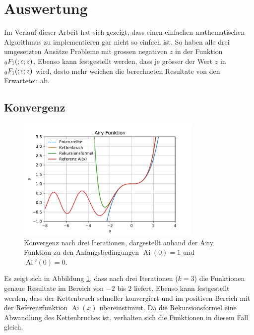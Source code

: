 %
%
%
\section{Auswertung
\label{0f1:section:teil3}}
Im Verlauf dieser Arbeit hat sich gezeigt, 
dass einen einfachen mathematischen Algorithmus zu implementieren
gar nicht so einfach ist.
So haben alle drei umgesetzten Ansätze Probleme mit grossen negativen $z$
in der Funktion $\mathstrut_0F_1(;c;z)$.
Ebenso kann festgestellt werden, dass je grösser der Wert $z$ in $\mathstrut_0F_1(;c;z)$ wird, desto mehr weichen die berechneten Resultate von den Erwarteten \cite{0f1:wolfram-0f1} ab.

\subsection{Konvergenz
\label{0f1:subsection:konvergenz}}
%
\begin{figure}
    \centering
    \includegraphics[width=0.8\textwidth]{papers/0f1/images/konvergenzAiry.pdf}
    \caption{Konvergenz nach drei Iterationen, dargestellt anhand der Airy Funktion zu den Anfangsbedingungen $\operatorname{Ai}(0)=1$ und $\operatorname{Ai}'(0)=0$.
    \label{0f1:ausblick:plot:airy:konvergenz}}
\end{figure}
Es zeigt sich in Abbildung \ref{0f1:ausblick:plot:airy:konvergenz}, dass nach drei Iterationen ($k = 3$) die Funktionen genaue Resultate im Bereich von $-2$ bis $2$ liefert. Ebenso kann festgestellt werden, dass der Kettenbruch schneller konvergiert und im positiven Bereich mit der Referenzfunktion $\operatorname{Ai}(x)$ übereinstimmt. Da die Rekursionsformel eine Abwandlung des Kettenbruches ist, verhalten sich die Funktionen in diesem Fall gleich.

